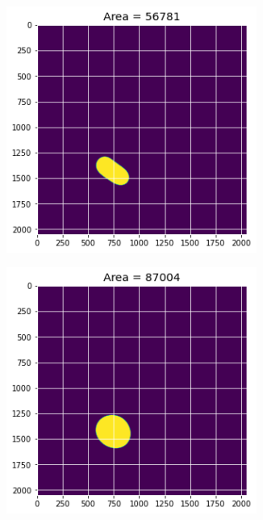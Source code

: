 \documentclass[12pt, a4paper]{report}
\begin{document}
\begin{figure}[H]
\begin{subfigure}{.24\textwidth}
  \label{img:microstrImg}
\end{subfigure}
\begin{subfigure}{.24\textwidth}
  \centering
  \includegraphics[width=0.9\textwidth]{Pictures/Growth/3.3.jpeg}
  \label{img:microstrImg}
\end{subfigure}
\begin{subfigure}{.24\textwidth}
  \centering
  \includegraphics[width=0.9\textwidth]{Pictures/Growth/3.4.jpeg}
  \label{img:microstrImg}
\end{subfigure}
\label{fig:test}
\end{figure}
\end{document}

